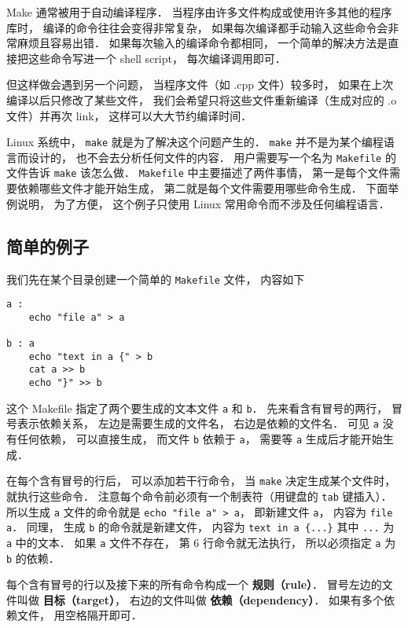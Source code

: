 
Make 通常被用于自动编译程序． 当程序由许多文件构成或使用许多其他的程序库时， 编译的命令往往会变得非常复杂， 如果每次编译都手动输入这些命令会非常麻烦且容易出错． 如果每次输入的编译命令都相同， 一个简单的解决方法是直接把这些命令写进一个 shell script， 每次编译调用即可．

但这样做会遇到另一个问题， 当程序文件（如 .cpp 文件）较多时， 如果在上次编译以后只修改了某些文件， 我们会希望只将这些文件重新编译（生成对应的 .o 文件）并再次 link， 这样可以大大节约编译时间．

Linux 系统中， \lstinline|make| 就是为了解决这个问题产生的． \lstinline|make| 并不是为某个编程语言而设计的， 也不会去分析任何文件的内容． 用户需要写一个名为 \lstinline|Makefile| 的文件告诉 \lstinline|make| 该怎么做． \lstinline|Makefile| 中主要描述了两件事情， 第一是每个文件需要依赖哪些文件才能开始生成， 第二就是每个文件需要用哪些命令生成． 下面举例说明， 为了方便， 这个例子只使用 Linux 常用命令而不涉及任何编程语言．


\subsection{简单的例子}
我们先在某个目录创建一个简单的 \lstinline|Makefile| 文件， 内容如下
\begin{lstlisting}
a :
	echo "file a" > a

b : a
	echo "text in a {" > b
	cat a >> b
	echo "}" >> b
\end{lstlisting}
这个 Makefile 指定了两个要生成的文本文件 \lstinline|a| 和 \lstinline|b|． 先来看含有冒号的两行， 冒号表示依赖关系， 左边是需要生成的文件名， 右边是依赖的文件名． 可见 \lstinline|a| 没有任何依赖， 可以直接生成， 而文件 \lstinline|b| 依赖于 \lstinline|a|， 需要等 \lstinline|a| 生成后才能开始生成．

在每个含有冒号的行后， 可以添加若干行命令， 当 \lstinline|make| 决定生成某个文件时， 就执行这些命令． 注意每个命令前必须有一个制表符（用键盘的 \lstinline|tab| 键插入）． 所以生成 \lstinline|a| 文件的命令就是 \lstinline|echo "file a" > a|， 即新建文件 \lstinline|a|， 内容为 \lstinline|file a|． 同理， 生成 \lstinline|b| 的命令就是新建文件， 内容为 \lstinline|text in a {...}| 其中 \lstinline|...| 为 \lstinline|a| 中的文本． 如果 \lstinline|a| 文件不存在， 第 6 行命令就无法执行， 所以必须指定 \lstinline|a| 为 \lstinline|b| 的依赖．

每个含有冒号的行以及接下来的所有命令构成一个 \textbf{规则（rule）}． 冒号左边的文件叫做 \textbf{目标（target）}， 右边的文件叫做 \textbf{依赖（dependency）}． 如果有多个依赖文件， 用空格隔开即可．

